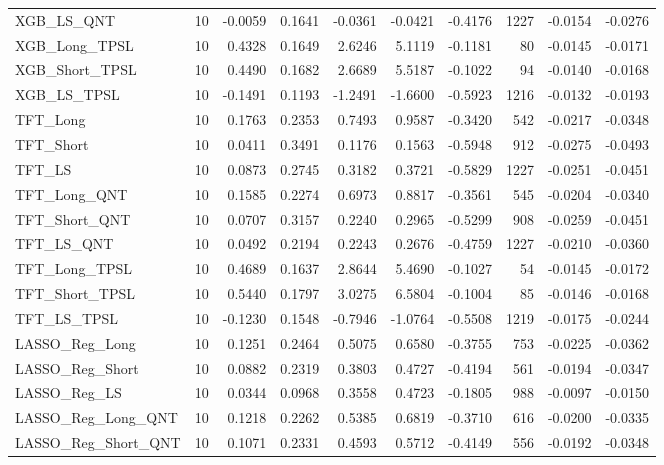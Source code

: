\begin{tabular}{llrrrrrrrr}
\cline{1-10}
XGB\_LS\_QNT & 10 & -0.0059 & 0.1641 & -0.0361 & -0.0421 & -0.4176 & 1227 & -0.0154 & -0.0276 \\
\cline{1-10}
XGB\_Long\_TPSL & 10 & 0.4328 & 0.1649 & 2.6246 & 5.1119 & -0.1181 & 80 & -0.0145 & -0.0171 \\
\cline{1-10}
XGB\_Short\_TPSL & 10 & 0.4490 & 0.1682 & 2.6689 & 5.5187 & -0.1022 & 94 & -0.0140 & -0.0168 \\
\cline{1-10}
XGB\_LS\_TPSL & 10 & -0.1491 & 0.1193 & -1.2491 & -1.6600 & -0.5923 & 1216 & -0.0132 & -0.0193 \\
\cline{1-10}
TFT\_Long & 10 & 0.1763 & 0.2353 & 0.7493 & 0.9587 & -0.3420 & 542 & -0.0217 & -0.0348 \\
\cline{1-10}
TFT\_Short & 10 & 0.0411 & 0.3491 & 0.1176 & 0.1563 & -0.5948 & 912 & -0.0275 & -0.0493 \\
\cline{1-10}
TFT\_LS & 10 & 0.0873 & 0.2745 & 0.3182 & 0.3721 & -0.5829 & 1227 & -0.0251 & -0.0451 \\
\cline{1-10}
TFT\_Long\_QNT & 10 & 0.1585 & 0.2274 & 0.6973 & 0.8817 & -0.3561 & 545 & -0.0204 & -0.0340 \\
\cline{1-10}
TFT\_Short\_QNT & 10 & 0.0707 & 0.3157 & 0.2240 & 0.2965 & -0.5299 & 908 & -0.0259 & -0.0451 \\
\cline{1-10}
TFT\_LS\_QNT & 10 & 0.0492 & 0.2194 & 0.2243 & 0.2676 & -0.4759 & 1227 & -0.0210 & -0.0360 \\
\cline{1-10}
TFT\_Long\_TPSL & 10 & 0.4689 & 0.1637 & 2.8644 & 5.4690 & -0.1027 & 54 & -0.0145 & -0.0172 \\
\cline{1-10}
TFT\_Short\_TPSL & 10 & 0.5440 & 0.1797 & 3.0275 & 6.5804 & -0.1004 & 85 & -0.0146 & -0.0168 \\
\cline{1-10}
TFT\_LS\_TPSL & 10 & -0.1230 & 0.1548 & -0.7946 & -1.0764 & -0.5508 & 1219 & -0.0175 & -0.0244 \\
\cline{1-10}
LASSO\_Reg\_Long & 10 & 0.1251 & 0.2464 & 0.5075 & 0.6580 & -0.3755 & 753 & -0.0225 & -0.0362 \\
\cline{1-10}
LASSO\_Reg\_Short & 10 & 0.0882 & 0.2319 & 0.3803 & 0.4727 & -0.4194 & 561 & -0.0194 & -0.0347 \\
\cline{1-10}
LASSO\_Reg\_LS & 10 & 0.0344 & 0.0968 & 0.3558 & 0.4723 & -0.1805 & 988 & -0.0097 & -0.0150 \\
\cline{1-10}
LASSO\_Reg\_Long\_QNT & 10 & 0.1218 & 0.2262 & 0.5385 & 0.6819 & -0.3710 & 616 & -0.0200 & -0.0335 \\
\cline{1-10}
LASSO\_Reg\_Short\_QNT & 10 & 0.1071 & 0.2331 & 0.4593 & 0.5712 & -0.4149 & 556 & -0.0192 & -0.0348 \\

\end{tabular}

